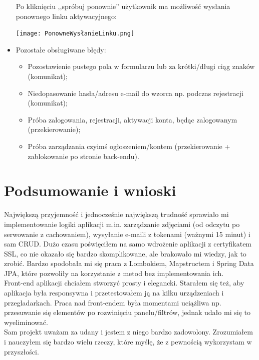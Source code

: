 \documentclass{article}
\begin{document}
\begin{itemize}
            
        Po kliknięciu ,,spróbuj ponownie'' użytkownik ma możliwość wysłania ponownego linku aktywacyjnego:
        \begin{center}
                    \centering  \texttt{[image: PonowneWysłanieLinku.png]}
        \end{center}
        \item Pozostałe obsługiwane błędy:
        \begin{itemize}
            \item Pozostawienie pustego pola w formularzu lub za krótki/długi ciąg znaków (komunikat);
            \item Niedopasowanie hasła/adresu e-mail do wzorca np. podczas rejestracji (komunikat); 
            \item Próba zalogowania, rejestracji, aktywacji konta, będąc zalogowanym (przekierowanie);
            \item Próba zarządzania czyimś ogłoszeniem/kontem (przekierowanie + zablokowanie po stronie back-endu).
        \end{itemize}
    \end{itemize}
    

    \section{Podsumowanie i wnioski}
         Największą przyjemność i jednocześnie największą trudność sprawiało mi implementowanie logiki aplikacji m.in. zarządzanie zdjęciami (od odczytu po serwowanie z cachowaniem), wysyłanie e-maili z tokenami (ważnymi 15 minut) i sam CRUD. Dużo czasu poświęciłem na samo wdrożenie aplikacji z certyfikatem SSL, co nie okazało się bardzo skomplikowane, ale brakowało mi wiedzy, jak to zrobić. 
         Bardzo spodobała mi się praca z Lombokiem, Mapstructem i Spring Data JPA, które pozwoliły na korzystanie z metod bez implementowania ich. \\
         
        Front-end aplikacji chciałem stworzyć prosty i elegancki. Starałem się też, aby aplikacja była responsywna i przetestowałem ją na kilku urządzeniach i przegladarkach. Praca nad front-endem była momentami uciążliwa np. przesuwanie się elementów po rozwinięciu panelu/filtrów, jednak udało mi się to wyeliminować. \\
        
        Sam projekt uważam za udany i jestem z niego bardzo zadowolony. Zrozumiałem i nauczyłem się bardzo wielu rzeczy, które myślę, że z pewnością wykorzystam w przyszłości.
\end{document}
